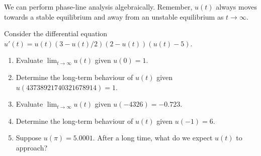 \documentclass[../main.tex]{subfiles}
\begin{document}
\clearpage
We can perform phase-line analysis algebraically. \faPencil*{} Remember, \(u(t)\) always moves towards a stable equilibrium and away from an unstable equilibrium as \(t \to \infty\).

\begin{example} \label{ex:phase-line-long-term}
  Consider the differential equation \(u'(t) = u(t)  (3 - u(t)/2) ( 2 - u(t) )(u(t) -5)\). 

  \begin{enumerate}[wide]
    \item Evaluate \(\lim_{t \to \infty} u(t)\) given \(u(0) = 1\).  

    \item Determine the long-term behaviour of \(u(t)\) given \(u(43738921740321678914) = 1\).  

    \item Evaluate \(\lim_{t \to \infty} u(t)\) given \(u(-4326) = -0.723\).  

    \item Determine the long-term behaviour of \(u(t)\) given \(u(-1) = 6\).  

    \item Suppose \(u(\pi) = 5.0001\). After a long time, what do we expect \(u(t)\) to approach?

  \end{enumerate}
\end{example}


%
%
\end{document}
